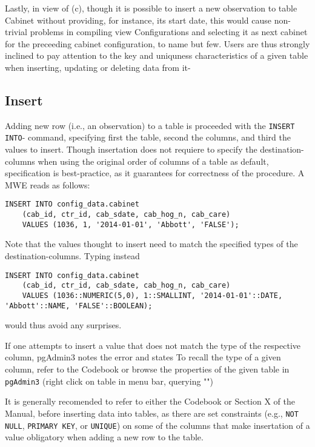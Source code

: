 Lastly, in view of (c), though it is possible to insert a new observation to table Cabinet without providing, for instance, its start date, this would cause non-trivial problems in compiling view Configurations and selecting it as next cabinet for the preceeding cabinet configuration, to name but few. Users are thus strongly inclined to pay attention to the key and uniquness characteristics of a given table when inserting, updating or deleting data from it-


\subsection{Insert}

Adding new row (i.e., an observation) to a table is proceeded with the \texttt{\footnotesize INSERT INTO}- command, specifying first the table, second the columns, and third the values to insert. Though insertation does not requiere to specify the destination-columns   when using the original order of columns of a table as default, specification is best-practice, as it guarantees for correctness of the procedure.
A MWE reads as follows:

\begin{lstlisting}[language=postgreSQL]
INSERT INTO config_data.cabinet
	(cab_id, ctr_id, cab_sdate, cab_hog_n, cab_care)
	VALUES (1036, 1, '2014-01-01', 'Abbott', 'FALSE');
\end{lstlisting}

Note that the values thought to insert need to match the specified types of the destination-columns. Typing instead 

\begin{lstlisting}[language=postgreSQL]
INSERT INTO config_data.cabinet
	(cab_id, ctr_id, cab_sdate, cab_hog_n, cab_care)
	VALUES (1036::NUMERIC(5,0), 1::SMALLINT, '2014-01-01'::DATE, 'Abbott'::NAME, 'FALSE'::BOOLEAN);
\end{lstlisting}

would thus avoid any surprises.

If one attempts to insert a value that does not match the type of the respective column, pgAdmin3 notes the error and states 
To recall the type of a given column, refer to the Codebook or browse the properties of the given table in  \texttt{\footnotesize pgAdmin3} (right click on table in menu bar, querying "")

It is generally recomended to refer to either the Codebook or Section X of the Manual, before inserting data into tables, as there are set constraints (e.g.,  \texttt{\footnotesize NOT NULL},  \texttt{\footnotesize PRIMARY KEY}, or  \texttt{\footnotesize UNIQUE}) on some of the columns that make insertation of a value obligatory when adding a new row to the table.

